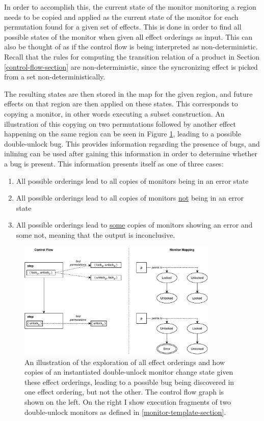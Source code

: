 \newpar In order to accomplish this, the current state of the monitor monitoring a region needs to be copied and applied as the current state of the monitor for each permutation found for a given set of effects. This is done in order to find all possible states of the monitor when given all effect orderings as input. This can also be thought of as if the control flow is being interpreted as non-deterministic. Recall that the rules for computing the transition relation of a product in Section \ref{control-flow-section} are non-deterministic, since the syncronizing effect is picked from a set non-deterministically.

\newpar The resulting states are then stored in the map for the given region, and future effects on that region are then applied on these states. This corresponds to copying a monitor, in other words executing a subset construction. An illustration of this copying on two permutations followed by another effect happening on the same region can be seen in Figure \ref{permutation-copy}, leading to a possible double-unlock bug. This provides information regarding the presence of bugs, and inlining can be used after gaining this information in order to determine whether a bug is present. This information presents itself as one of three cases: 

\begin{enumerate}
    \item All possible orderings lead to all copies of monitors being in an error state 
    \item All possible orderings lead to all copies of monitors \underline{not} being in an error state 
    \item All possible orderings lead to \underline{some} copies of monitors showing an error and some not, meaning that the output is inconclusive.
\end{enumerate}

\begin{figure}[H]
    \centering
    \includegraphics[width=0.85\textwidth]{implementation/figures/permutation-copy}
    \caption{An illustration of the exploration of all effect orderings and how copies of an instantiated double-unlock monitor change state given these effect orderings, leading to a possible bug being discovered in one effect ordering, but not the other. The control flow graph is shown on the left. On the right I show execution fragments of two double-unlock monitors as defined in \ref{monitor-template-section}.}
    \label{permutation-copy}
\end{figure}

